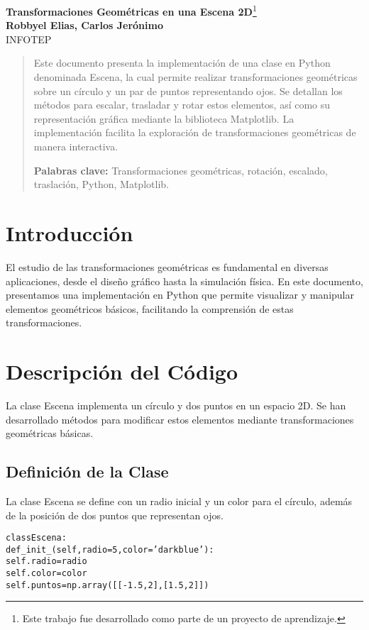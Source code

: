 \documentclass[a4paper, 10pt]{article}
\begin{document}
\begin{center}
\LARGE
\textbf{Transformaciones Geométricas en una Escena 2D}\footnote{Este trabajo fue desarrollado como parte de un proyecto de aprendizaje.}\\[6pt]
\small
\textbf{Robbyel Elias, Carlos Jerónimo}\\[6pt]
INFOTEP\\[6pt]
\end{center}

\begin{abstract}
Este documento presenta la implementación de una clase en Python denominada Escena, la cual permite realizar transformaciones geométricas sobre un círculo y un par de puntos representando ojos. Se detallan los métodos para escalar, trasladar y rotar estos elementos, así como su representación gráfica mediante la biblioteca Matplotlib. La implementación facilita la exploración de transformaciones geométricas de manera interactiva.

\textbf{Palabras clave:} Transformaciones geométricas, rotación, escalado, traslación, Python, Matplotlib.
\end{abstract}

\section{Introducción}
El estudio de las transformaciones geométricas es fundamental en diversas aplicaciones, desde el diseño gráfico hasta la simulación física. En este documento, presentamos una implementación en Python que permite visualizar y manipular elementos geométricos básicos, facilitando la comprensión de estas transformaciones.

\section{Descripción del Código}
La clase Escena implementa un círculo y dos puntos en un espacio 2D. Se han desarrollado métodos para modificar estos elementos mediante transformaciones geométricas básicas.

\subsection{Definición de la Clase}
La clase Escena se define con un radio inicial y un color para el círculo, además de la posición de dos puntos que representan ojos.

\begin{alltt}
class Escena:
    def _init_(self, radio=5, color='darkblue'):
        self.radio = radio
        self.color = color
        self.puntos = np.array([[-1.5, 2], [1.5, 2]])
\end{alltt}
\end{document}
